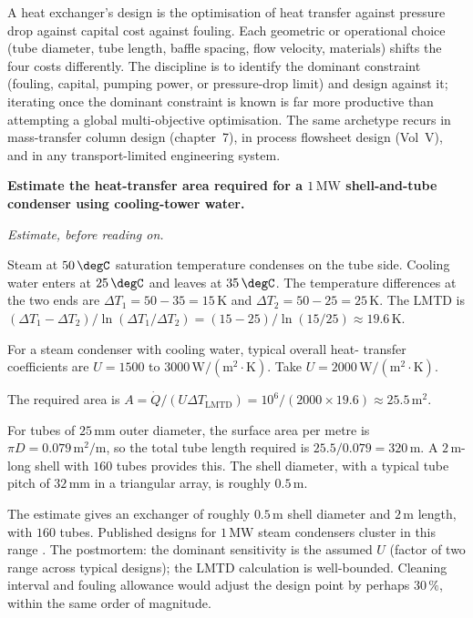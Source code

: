 \begin{archetype}
A heat exchanger's design is the optimisation of heat transfer
against pressure drop against capital cost against fouling. Each
geometric or operational choice (tube diameter, tube length, baffle
spacing, flow velocity, materials) shifts the four costs differently.
The discipline is to identify the dominant constraint (fouling,
capital, pumping power, or pressure-drop limit) and design against
it; iterating once the dominant constraint is known is far more
productive than attempting a global multi-objective optimisation.
The same archetype recurs in mass-transfer column design (chapter~7),
in process flowsheet design (Vol~V), and in any transport-limited
engineering system.
\end{archetype}

\begin{estimation}
\textbf{Estimate the heat-transfer area required for a $1\,\text{MW}$
shell-and-tube condenser using cooling-tower water.}

\smallskip
\textit{Estimate, before reading on.}

\smallskip
Steam at $50\,\degC$ saturation temperature condenses on the tube
side. Cooling water enters at $25\,\degC$ and leaves at $35\,\degC$.
The temperature differences at the two ends are $\Delta T_1 = 50 -
35 = 15\,\si{\kelvin}$ and $\Delta T_2 = 50 - 25 = 25\,\si{\kelvin}$.
The LMTD is $(\Delta T_1 - \Delta T_2)/\ln(\Delta T_1/\Delta T_2) =
(15 - 25)/\ln(15/25) \approx 19.6\,\si{\kelvin}$.

For a steam condenser with cooling water, typical overall heat-
transfer coefficients are $U = 1500$ to $3000\,\text{W}/(\text{m}^2
\cdot\si{\kelvin})$. Take $U = 2000\,\text{W}/(\text{m}^2\cdot\si{
\kelvin})$.

The required area is $A = \dot{Q}/(U \Delta T_{\text{LMTD}}) = 10^6/(
2000 \times 19.6) \approx 25.5\,\text{m}^2$.

For tubes of $25\,\si{\milli\meter}$ outer diameter, the surface area
per metre is $\pi D = 0.079\,\text{m}^2/\text{m}$, so the total tube
length required is $25.5/0.079 = 320\,\text{m}$. A $2\,\text{m}$-long
shell with $160$ tubes provides this. The shell diameter, with a
typical tube pitch of $32\,\si{\milli\meter}$ in a triangular array,
is roughly $0.5\,\text{m}$.

The estimate gives an exchanger of roughly $0.5\,\text{m}$ shell
diameter and $2\,\text{m}$ length, with $160$ tubes. Published
designs for $1\,\text{MW}$ steam condensers cluster in this range
\cite{text:cengel-boles}. The postmortem: the dominant
sensitivity is the assumed $U$ (factor of two range across typical
designs); the LMTD calculation is well-bounded. Cleaning interval
and fouling allowance would adjust the design point by perhaps
$30\,\%$, within the same order of magnitude.
\end{estimation}

